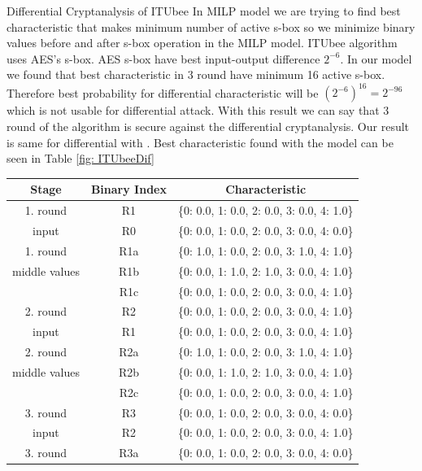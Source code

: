 \documentclass [version=final]{iacrcc}
\begin{document}
\begin{section}{Differential Cryptanalysis of ITUbee}
In MILP model we are trying to find best characteristic that makes minimum number of active s-box so we minimize binary values before and after s-box operation in the MILP model. ITUbee algorithm uses AES's \cite{dworkin2001advanced} s-box. AES s-box have best input-output difference $2^{-6}$. In our model we found that best characteristic in 3 round have minimum 16 active s-box. Therefore best probability for differential characteristic will be $(2^{-6})^{16}= 2^{-96}  $ which is not usable for differential attack. With this result we can say that 3 round of the algorithm is secure against the differential cryptanalysis. Our result is same for differential with \cite{karakocc2013itubee}. Best characteristic found with the model can be seen in Table \ref{fig: ITUbeeDif}

\begin{table}[H]
    \centering
    \begin{tabular}{|c|c|c|}
        \hline
        \textbf{Stage} & \textbf{Binary Index} & \textbf{Characteristic} \\
        \hline
        1. round  & R1 & \{0: 0.0, 1: 0.0, 2: 0.0, 3: 0.0, 4: 1.0\} \\
        input      & R0 & \{0: 0.0, 1: 0.0, 2: 0.0, 3: 0.0, 4: 0.0\} \\
        \hline
        1. round  & R1a & \{0: 1.0, 1: 0.0, 2: 0.0, 3: 1.0, 4: 1.0\} \\
        middle values   & R1b & \{0: 0.0, 1: 1.0, 2: 1.0, 3: 0.0, 4: 1.0\} \\
                   & R1c & \{0: 0.0, 1: 0.0, 2: 0.0, 3: 0.0, 4: 1.0\} \\
        \hline
        2. round& R2 & \{0: 0.0, 1: 0.0, 2: 0.0, 3: 0.0, 4: 1.0\} \\
        input      & R1 & \{0: 0.0, 1: 0.0, 2: 0.0, 3: 0.0, 4: 1.0\} \\
        \hline
        2. round & R2a & \{0: 1.0, 1: 0.0, 2: 0.0, 3: 1.0, 4: 1.0\} \\
        middle values  & R2b & \{0: 0.0, 1: 1.0, 2: 1.0, 3: 0.0, 4: 1.0\} \\
                   & R2c & \{0: 0.0, 1: 0.0, 2: 0.0, 3: 0.0, 4: 1.0\} \\
        \hline
        3. round  & R3 & \{0: 0.0, 1: 0.0, 2: 0.0, 3: 0.0, 4: 0.0\} \\
        input     & R2 & \{0: 0.0, 1: 0.0, 2: 0.0, 3: 0.0, 4: 1.0\} \\
        \hline
        3. round  & R3a & \{0: 0.0, 1: 0.0, 2: 0.0, 3: 0.0, 4: 0.0\} \\

\end{tabular}
\end{table}
\end{section}
\end{document}

